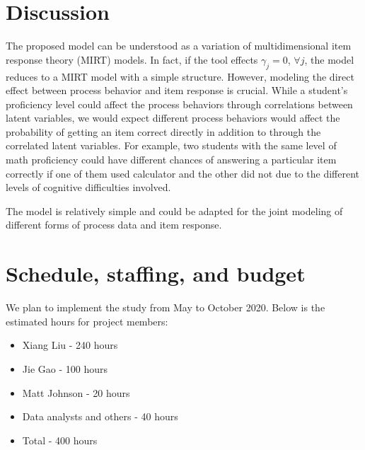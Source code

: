 \documentclass[11pt, letterpaper]{article}
\begin{document}
  \section{Discussion}
  The proposed model can be understood as a variation of multidimensional item
  response theory (MIRT) models. In fact, if the tool effects $\gamma_j = 0$,
  $\forall j$, the model reduces to a MIRT model with a simple structure.
  However, modeling the direct effect between process behavior and item response
  is crucial. While a student's proficiency level could affect the process
  behaviors through correlations between latent variables, we would expect
  different process behaviors would affect the probability of getting an item
  correct directly in addition to through the correlated latent variables. For
  example, two students with the same level of math proficiency could have
  different chances of answering a particular item correctly if one of them used
  calculator and the other did not due to the different levels of cognitive
  difficulties involved.

  The model is relatively simple and could be adapted for the joint modeling of
  different forms of process data and item response.

  \section{Schedule, staffing, and budget}
  We plan to implement the study from May to October 2020. Below is the
  estimated hours for project members:
  \begin{itemize}
    \item Xiang Liu - 240 hours
    \item Jie Gao   - 100 hours
    \item Matt Johnson - 20 hours
    \item Data analysts and others - 40 hours
    \item Total - 400 hours
  \end{itemize}
 


  \newpage
  \printbibliography
\end{document}

